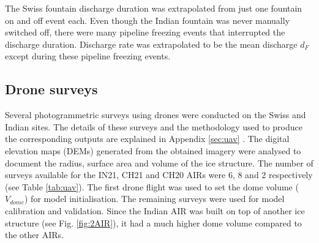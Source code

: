 \documentclass[utf8]{frontiersSCNS}
\begin{document}
The Swiss fountain discharge duration was extrapolated from just one fountain on and off event each. Even though
the Indian fountain was never manually switched off, there were many pipeline freezing events that interrupted
the discharge duration. Discharge rate was extrapolated to be the mean discharge $d_F$ except during these
pipeline freezing events.

\subsection{Drone surveys}

Several photogrammetric surveys using drones were conducted on the Swiss and Indian sites. The details of these
surveys and the methodology used to produce the corresponding outputs are explained in Appendix \ref{sec:uav} .
The digital elevation maps (DEMs) generated from the obtained imagery were analysed to document the radius,
surface area and volume of the ice structure. The number of surveys available for the IN21, CH21 and CH20 AIRs
were 6, 8 and 2 respectively (see Table \ref{tab:uav}). The first drone flight was used to set the dome volume
($V_{dome}$) for model initialisation. The remaining surveys were used for model calibration and validation.
Since the Indian AIR was built on top of another ice structure (see Fig. \ref{fig:2AIR}), it had a much higher
dome volume compared to the other AIRs.  
\end{document}
